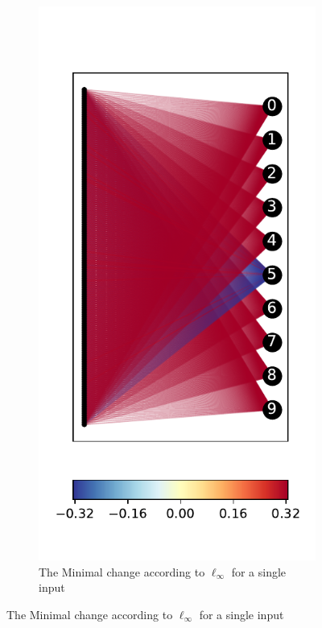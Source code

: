 \documentclass{easychair}
\begin{document}
 
\begin{figure}
\centering
  \begin{subfigure}{0.4\linewidth}
  \includegraphics[width=\linewidth]{../data/results/problem3/last_layer_1_wm_example.pdf}
     \caption{The Minimal change according to $\ell_\infty$ for a single input}

\end{subfigure}
\end{figure}
\end{document}
